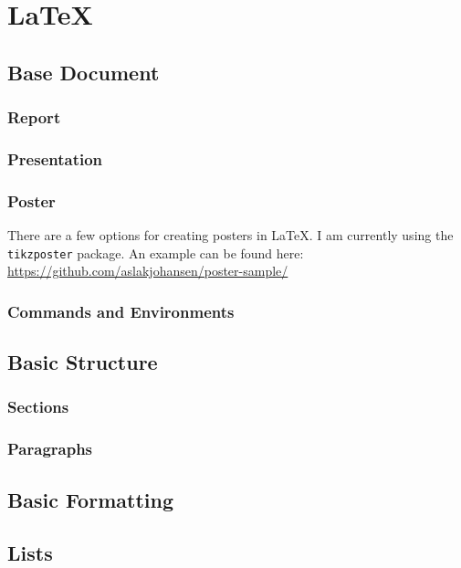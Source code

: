 \chapter{\LaTeX}
\label{latex}

\section{Base Document}

\subsection{Report}
\subsection{Presentation}
\subsection{Poster}

There are a few options for creating posters in \LaTeX. I am currently using the \texttt{tikzposter} package. An example can be found here: \url{https://github.com/aslakjohansen/poster-sample/}

\subsection{Commands and Environments}

\section{Basic Structure}
\subsection{Sections}



\subsection{Paragraphs}

\section{Basic Formatting}

\section{Lists}

